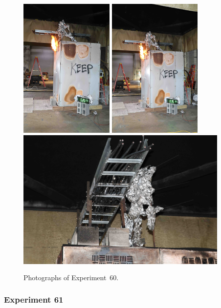 \documentclass[12pt]{article}
\begin{document}
\begin{figure}[p]
\centering
\includegraphics[height=2.75in,angle=-90]{../FIGURES/Test_60_26_min_23_s}
\includegraphics[height=2.75in,angle=-90]{../FIGURES/Test_60_35_min_18_s} \\
\includegraphics[height=2.75in]{../FIGURES/Test_60_scar}
\caption[Photographs of Experiment~60]{Photographs of Experiment~60.}
\label{fig:Test_60_photos}
\end{figure}


\clearpage

\subsubsection{Experiment 61}
\end{document}
